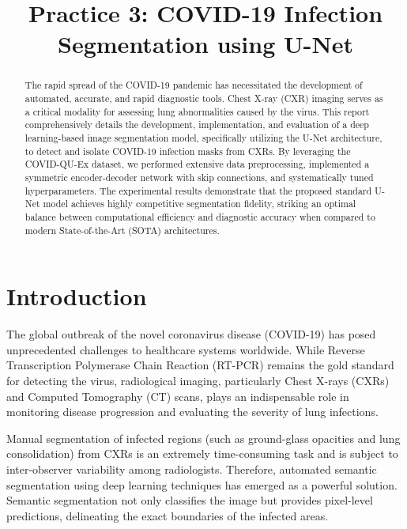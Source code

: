 \documentclass[conference]{IEEEtran}
\begin{document}
\title{Practice 3: COVID-19 Infection Segmentation using U-Net}

\author{
}

\date{}

\maketitle

\begin{abstract}
The rapid spread of the COVID-19 pandemic has necessitated the development of automated, accurate, and rapid diagnostic tools. Chest X-ray (CXR) imaging serves as a critical modality for assessing lung abnormalities caused by the virus. This report comprehensively details the development, implementation, and evaluation of a deep learning-based image segmentation model, specifically utilizing the U-Net architecture, to detect and isolate COVID-19 infection masks from CXRs. By leveraging the COVID-QU-Ex dataset, we performed extensive data preprocessing, implemented a symmetric encoder-decoder network with skip connections, and systematically tuned hyperparameters. The experimental results demonstrate that the proposed standard U-Net model achieves highly competitive segmentation fidelity, striking an optimal balance between computational efficiency and diagnostic accuracy when compared to modern State-of-the-Art (SOTA) architectures.
\end{abstract}

\section{Introduction}
The global outbreak of the novel coronavirus disease (COVID-19) has posed unprecedented challenges to healthcare systems worldwide. While Reverse Transcription Polymerase Chain Reaction (RT-PCR) remains the gold standard for detecting the virus, radiological imaging, particularly Chest X-rays (CXRs) and Computed Tomography (CT) scans, plays an indispensable role in monitoring disease progression and evaluating the severity of lung infections.

Manual segmentation of infected regions (such as ground-glass opacities and lung consolidation) from CXRs is an extremely time-consuming task and is subject to inter-observer variability among radiologists. Therefore, automated semantic segmentation using deep learning techniques has emerged as a powerful solution. Semantic segmentation not only classifies the image but provides pixel-level predictions, delineating the exact boundaries of the infected areas. 
\end{document}
